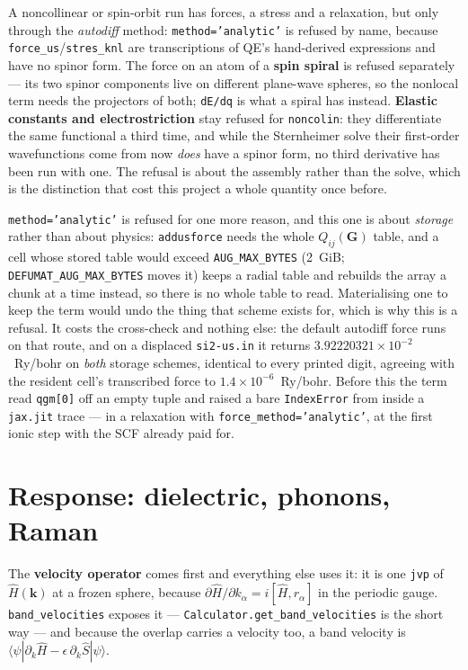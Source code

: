 \documentclass[11pt,a4paper]{article}
\newcommand{\code}[1]{\texttt{\small #1}}
\begin{document}
\begin{refuses}
A noncollinear or spin-orbit run has forces, a stress and a relaxation, but only
through the \emph{autodiff} method: \code{method='analytic'} is refused by name,
because \code{force\_us}/\code{stres\_knl} are transcriptions of QE's
hand-derived expressions and have no spinor form. The force on an atom of a
\textbf{spin spiral} is refused separately --- its two spinor components live on
different plane-wave spheres, so the nonlocal term needs the projectors of both;
\code{dE/dq} is what a spiral has instead. \textbf{Elastic constants and
electrostriction} stay refused for \code{noncolin}: they differentiate the same
functional a third time, and while the Sternheimer solve their first-order
wavefunctions come from now \emph{does} have a spinor form, no third derivative
has been run with one. The refusal is about the assembly rather than the solve,
which is the distinction that cost this project a whole quantity once before.

\code{method='analytic'} is refused for one more reason, and this one is about
\emph{storage} rather than about physics: \code{addusforce} needs the whole
$Q_{ij}(\mathbf G)$ table, and a cell whose stored table would exceed
\code{AUG\_MAX\_BYTES} (2~GiB; \code{DEFUMAT\_AUG\_MAX\_BYTES} moves it)
keeps a radial table and rebuilds the array a chunk at a time instead, so there
is no whole table to read. Materialising one to keep the term would undo the
thing that scheme exists for, which is why this is a refusal. It costs the
cross-check and nothing else: the default autodiff force runs on that route, and
on a displaced \code{si2-us.in} it returns $3.92220321\times10^{-2}$~Ry/bohr on
\emph{both} storage schemes, identical to every printed digit, agreeing with the
resident cell's transcribed force to $1.4\times10^{-6}$~Ry/bohr. Before this the
term read \code{qgm[0]} off an empty tuple and raised a bare \code{IndexError}
from inside a \code{jax.jit} trace --- in a relaxation with
\code{force\_method='analytic'}, at the first ionic step with the SCF already
paid for.
\end{refuses}

\section{Response: dielectric, phonons, Raman}

The \textbf{velocity operator} comes first and everything else uses it: it is one
\code{jvp} of $\hat H(\mathbf k)$ at a frozen sphere, because
$\partial\hat H/\partial k_\alpha = i[\hat H, r_\alpha]$ in the periodic gauge.
\code{band\_velocities} exposes it --- \code{Calculator.get\_band\_velocities}
is the short way --- and because the overlap carries a velocity too, a band
velocity is
$\langle\psi|\partial_k\hat H - \epsilon\,\partial_k\hat S|\psi\rangle$.
\end{document}
